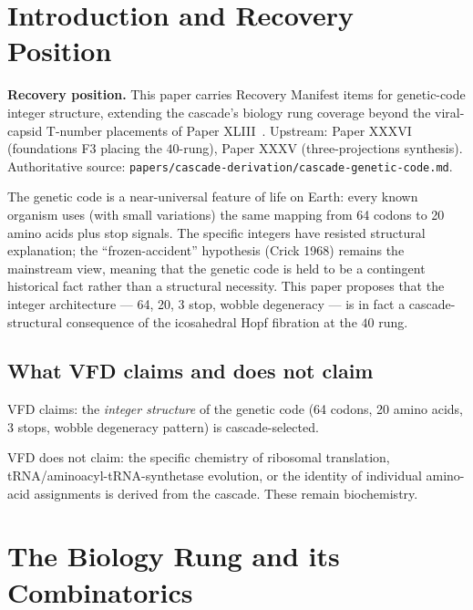 \documentclass[12pt]{article}
\theoremstyle{remark}
\begin{document}
\section{Introduction and Recovery Position}\label{sec:intro}

\textbf{Recovery position.} This paper carries Recovery Manifest items for genetic-code integer structure, extending the cascade's biology rung coverage beyond the viral-capsid T-number placements of Paper XLIII~\citep{SmartXLIII}. Upstream: Paper XXXVI (foundations F3 placing the $40$-rung), Paper XXXV (three-projections synthesis). Authoritative source: \texttt{papers/cascade-derivation/cascade-genetic-code.md}.

The genetic code is a near-universal feature of life on Earth: every known organism uses (with small variations) the same mapping from 64 codons to 20 amino acids plus stop signals. The specific integers have resisted structural explanation; the ``frozen-accident'' hypothesis (Crick 1968) remains the mainstream view, meaning that the genetic code is held to be a contingent historical fact rather than a structural necessity. This paper proposes that the integer architecture --- 64, 20, 3 stop, wobble degeneracy --- is in fact a cascade-structural consequence of the icosahedral Hopf fibration at the $40$ rung.

\subsection{What VFD claims and does not claim}

VFD claims: the \emph{integer structure} of the genetic code (64 codons, 20 amino acids, 3 stops, wobble degeneracy pattern) is cascade-selected.

VFD does not claim: the specific chemistry of ribosomal translation, tRNA/aminoacyl-tRNA-synthetase evolution, or the identity of individual amino-acid assignments is derived from the cascade. These remain biochemistry.

\section{The Biology Rung and its Combinatorics}\label{sec:rung}
\end{document}
